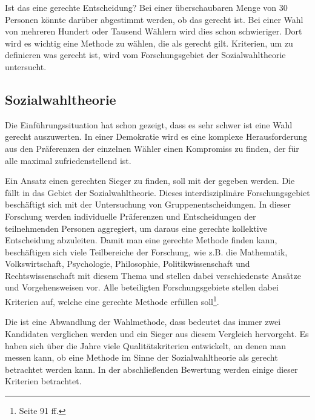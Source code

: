 Ist das eine gerechte Entscheidung? Bei einer überschaubaren Menge von 30 Personen könnte darüber abgestimmt werden, ob das gerecht ist. Bei einer Wahl von mehreren Hundert oder Tausend Wählern wird dies schon schwieriger. Dort wird es wichtig eine Methode zu wählen, die als \glqq gerecht\grqq{} gilt.
Kriterien, um zu definieren was gerecht ist, wird vom Forschungsgebiet der Sozialwahltheorie untersucht.

\newpage

\subsection{Sozialwahltheorie} 
\label{sec:problemstellung}
Die Einführungssituation hat schon gezeigt, dass es sehr schwer ist eine Wahl gerecht auszuwerten. In einer  Demokratie wird es eine komplexe Herausforderung aus den Präferenzen der einzelnen Wähler einen Kompromiss zu finden, der für alle maximal zufriedenstellend ist.

Ein Ansatz einen gerechten Sieger zu finden, soll mit der \schulze gegeben werden. Die \schulze fällt in das Gebiet der Sozialwahltheorie. Dieses interdisziplinäre Forschungsgebiet beschäftigt sich mit der Untersuchung von Gruppenentscheidungen. In dieser Forschung werden individuelle Präferenzen und Entscheidungen der teilnehmenden Personen aggregiert, um daraus eine \glqq gerechte\grqq{} kollektive Entscheidung abzuleiten. Damit man eine \glqq gerechte\grqq{} Methode finden kann, beschäftigen sich viele Teilbereiche der Forschung, wie z.B. die Mathematik, Volkswirtschaft, Psychologie, Philosophie, Politikwissenschaft und Rechtswissenschaft mit diesem Thema und stellen dabei verschiedenste Ansätze und Vorgehensweisen vor. Alle beteiligten Forschungsgebiete stellen dabei Kriterien auf, welche eine \glqq gerechte\grqq{} Methode erfüllen soll\footnote{\Vgl \citet{scheubrein2013computerunterstuetzte} Seite 91 ff.}.

Die \schulze ist eine Abwandlung der \condorcet Wahlmethode, dass bedeutet das immer zwei Kandidaten verglichen werden und ein Sieger aus diesem Vergleich hervorgeht. Es haben sich über die Jahre viele Qualitätskriterien entwickelt, an denen man messen kann, ob eine Methode im Sinne der Sozialwahltheorie als gerecht betrachtet werden kann. In der abschließenden Bewertung werden einige dieser Kriterien betrachtet.






